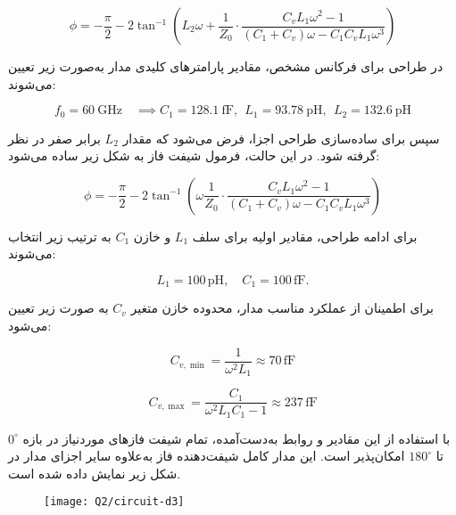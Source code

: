 \documentclass[12pt,onecolumn,a4paper]{article}
\begin{document}
\begin{equation}
	\phi = -\frac{\pi}{2} - 2 \tan^{-1} \left( L_2 \omega + \frac{1}{Z_0} \cdot \frac{C_v L_1 \omega^2 - 1}{(C_1 + C_v) \omega - C_1 C_v L_1 \omega^3} \right)
\end{equation}




در طراحی  برای فرکانس مشخص، مقادیر پارامترهای کلیدی مدار به‌صورت زیر تعیین می‌شوند:


\begin{equation}
	f_0 = 60 \ \text{GHz}
	\quad \implies C_1 = 128.1 \ \text{fF},\ \ L_1 = 93.78 \  \text{pH},\ \ L_2 = 132.6 \ \text{pH}
\end{equation}


سپس برای ساده‌سازی طراحی اجزا، فرض می‌شود که مقدار \( L_2 \) برابر صفر در نظر گرفته شود. در این حالت، فرمول شیفت فاز به شکل زیر ساده می‌شود:

\begin{equation}
	\phi = -\frac{\pi}{2} - 2 \tan^{-1} \left( \omega \frac{1}{Z_0} \cdot \frac{C_v L_1 \omega^2 - 1}{(C_1 + C_v) \omega - C_1 C_v L_1 \omega^3} \right)
\end{equation}



برای ادامه طراحی، مقادیر اولیه برای سلف \( L_1 \) و خازن \( C_1 \) به ترتیب زیر انتخاب می‌شوند:

\[
L_1 = 100 \, \text{pH}, \quad C_1 = 100 \, \text{fF}.
\]



برای اطمینان از عملکرد مناسب مدار، محدوده خازن متغیر \( C_v \) به صورت زیر تعیین می‌شود:

\begin{equation}
	C_{v,\min} = \frac{1}{\omega^2 L_1} \approx 70 \, \text{fF}
\end{equation}

\begin{equation}
	C_{v,\max} = \frac{C_1}{\omega^2 L_1 C_1 - 1} \approx 237 \, \text{fF}
\end{equation}



با استفاده از این مقادیر و روابط به‌دست‌آمده، تمام شیفت فازهای موردنیاز در بازه \( 0^\circ \) تا \( 180^\circ \) امکان‌پذیر است. این مدار کامل شیفت‌دهنده فاز به‌علاوه سایر اجزای مدار  در شکل زیر نمایش داده شده است.


\begin{figure}[H]
	\centering
	\texttt{[image: Q2/circuit-d3]}
	\caption{}
	\label{fig:circuit-d3}
\end{figure}
\end{document}
